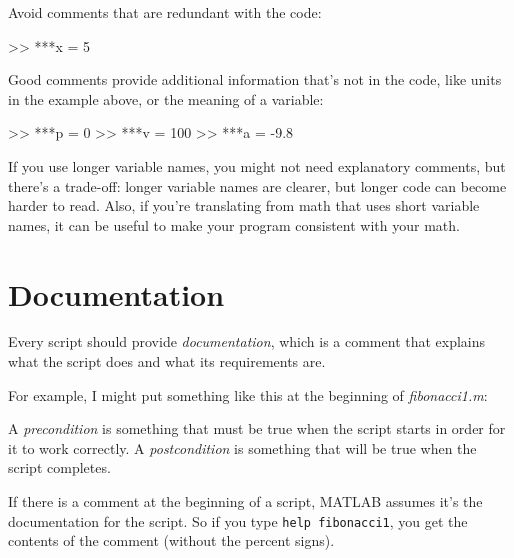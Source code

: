 
Avoid comments that are redundant with the code:

\begin{code}
>> ***x = 5        %
\end{code}

Good comments provide additional information that's not in the
code, like units in the example above, or the meaning of a variable:

\begin{code}
>> ***p = 0         %
>> ***v = 100       %
>> ***a = -9.8      %
\end{code}

If you use longer variable names, you might not need explanatory
comments, but there's a trade-off: longer variable names are clearer, but longer code can become harder
to read.
Also, if you're translating from math
that uses short variable names, it can be useful to make your
program consistent with your math.


\section{Documentation}

Every script should provide \emph{documentation}, which is a comment
that explains what the script does and what its requirements are.

For example, I might put something like this at the beginning of \emph{fibonacci1.m}:


\begin{code}
\end{code}

A \emph{precondition} is something that must be true when the script
starts in order for it to work correctly.  A \emph{postcondition}
is something that will be true when the script completes.


If there is a comment at the beginning of a script, MATLAB assumes
it's the documentation for the script. So if you type \lstinline{help fibonacci1}, you get the contents of the comment (without the percent
signs).

